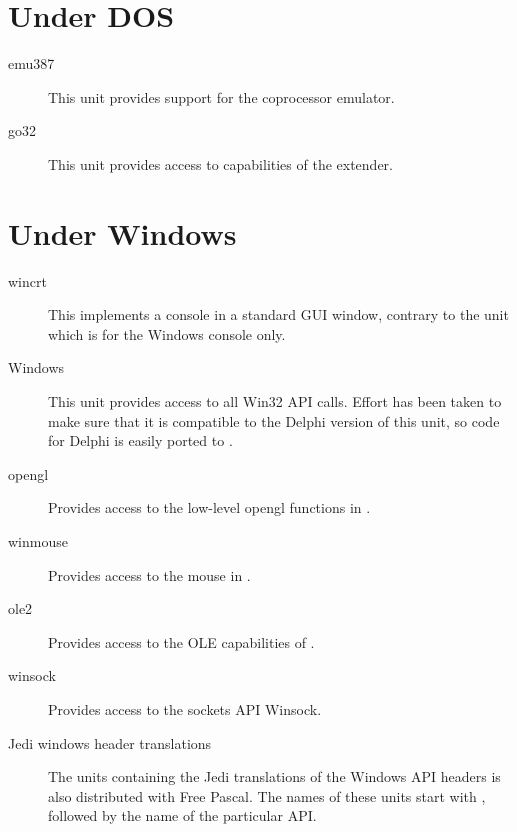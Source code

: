 %
%
\section{Under DOS}
\begin{description}
\item [emu387] This unit provides support for the coprocessor emulator.
\item [go32] This unit provides access to capabilities of the 
\dos extender.
\end{description}

%
%
\section{Under Windows}
\begin{description}
\item[wincrt] This implements a console in a standard GUI window, contrary
to the  unit which is for the Windows console only.
\item[Windows] This unit provides access to all Win32 API calls. Effort has
been taken to make sure that it is compatible to the Delphi version of this
unit, so code for Delphi is easily ported to \fpc.
\item[opengl] Provides access to the low-level opengl functions in \windows.
\item[winmouse] Provides access to the mouse in \windows.
\item[ole2] Provides access to the OLE capabilities of \windows.
\item[winsock] Provides access to the \windows sockets API Winsock.
\item[Jedi windows header translations] The units containing the Jedi
translations of the Windows API headers is also distributed with Free
Pascal. The names of these units start with , followed by the 
name of the particular API.
\end{description}

%
%
